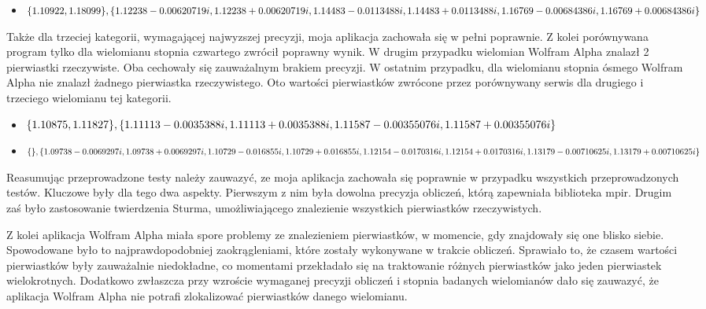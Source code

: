 \documentclass[oneside,a4paper]{book}
\begin{document}
	\begin{itemize}
		\item $\{1.10922, 1.18099\}, \{1.12238-0.00620719i, 1.12238+0.00620719i, \\
		1.14483-0.0113488i, 1.14483+0.0113488i, 1.16769-0.00684386 i, 1.16769+0.00684386i\}$
	\end{itemize}
	
	Także dla trzeciej kategorii, wymagającej najwyzszej precyzji, moja aplikacja zachowała się w pełni poprawnie. Z kolei porównywana program tylko dla wielomianu stopnia czwartego zwrócił poprawny wynik. W drugim przypadku wielomian Wolfram Alpha znalazł 2 pierwiastki rzeczywiste. Oba cechowały się zauważalnym brakiem precyzji. W ostatnim przypadku, dla wielomianu stopnia ósmego Wolfram Alpha nie znalazł żadnego pierwiastka rzeczywistego. Oto wartości pierwiastków zwrócone przez porównywany serwis dla drugiego i trzeciego wielomianu tej kategorii.
	
	\begin{itemize}
		\item $\{1.10875, 1.11827\}, \{1.11113-0.0035388i,1.11113+0.0035388i, \\
		1.11587-0.00355076i, 1.11587+0.00355076i\}$
		\item $\{\}, \{1.09738-0.0069297i,1.09738+0.0069297i, 1.10729-0.016855i, \\
		1.10729+0.016855i, 1.12154-0.0170316i, 1.12154+0.0170316i, 1.13179-0.00710625i, \\ 1.13179+0.00710625i\}$
	\end{itemize}	
	
	Reasumując przeprowadzone testy należy zauwazyć, ze moja aplikacja zachowała się poprawnie w przypadku wszystkich przeprowadzonych testów. Kluczowe były dla tego dwa aspekty. Pierwszym z nim była dowolna precyzja obliczeń, którą zapewniała biblioteka mpir. Drugim zaś było zastosowanie twierdzenia Sturma, umożliwiającego znalezienie wszystkich pierwiastków rzeczywistych.
	
	Z kolei aplikacja Wolfram Alpha miała spore problemy ze znalezieniem pierwiastków, w momencie, gdy znajdowały się one blisko siebie. Spowodowane było to najprawdopodobniej zaokrągleniami, które zostały wykonywane w trakcie obliczeń. Sprawiało to, że czasem wartości pierwiastków były zauważalnie niedokładne, co momentami przekładało się na traktowanie różnych pierwiastków jako jeden pierwiastek wielokrotnych. Dodatkowo zwłaszcza przy wzroście wymaganej precyzji obliczeń i stopnia badanych wielomianów dało się zauwazyć, że aplikacja Wolfram Alpha nie potrafi zlokalizować pierwiastków danego wielomianu.
	
\end{document}
